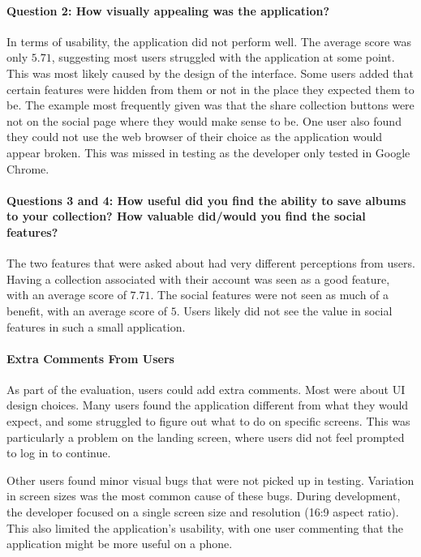 \paragraph{Question 2: How visually appealing was the application?}
In terms of usability, the application did not perform well. The average score was only $5.71$, suggesting most users struggled with the application at some point. This was most likely caused by the design of the interface. Some users added that certain features were hidden from them or not in the place they expected them to be. The example most frequently given was that the share collection buttons were not on the social page where they would make sense to be. One user also found they could not use the web browser of their choice as the application would appear broken. This was missed in testing as the developer only tested in Google Chrome.

\paragraph{Questions 3 and 4: How useful did you find the ability to save albums to your collection? How valuable did/would you find the social features?}
The two features that were asked about had very different perceptions from users. Having a collection associated with their account was seen as a good feature, with an average score of $7.71$. The social features were not seen as much of a benefit, with an average score of $5$. Users likely did not see the value in social features in such a small application.

\paragraph{Extra Comments From Users}
As part of the evaluation, users could add extra comments. Most were about UI design choices. Many users found the application different from what they would expect, and some struggled to figure out what to do on specific screens. This was particularly a problem on the landing screen, where users did not feel prompted to log in to continue.

Other users found minor visual bugs that were not picked up in testing. Variation in screen sizes was the most common cause of these bugs. During development, the developer focused on a single screen size and resolution (16:9 aspect ratio). This also limited the application's usability, with one user commenting that the application might be more useful on a phone.

